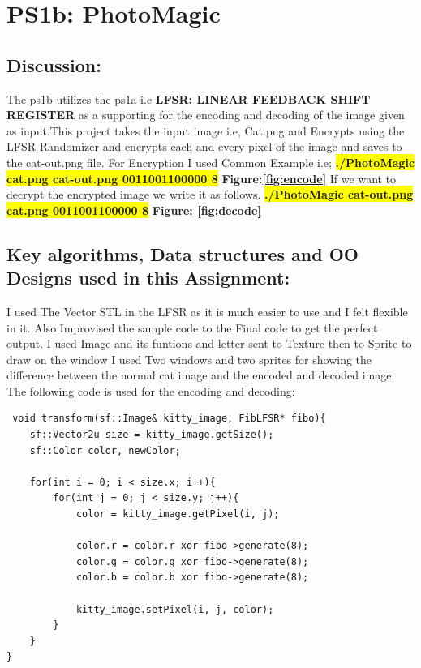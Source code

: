 \section{PS1b: PhotoMagic}\label{sec:ps1b}
\graphicspath{{ps1b}}
\subsection{Discussion:}\label{sec:ps1b:disc}
The ps1b utilizes the ps1a i.e \textbf{LFSR: LINEAR FEEDBACK SHIFT REGISTER} as a supporting for the encoding and decoding of the image given as input.This project takes the input image i.e, Cat.png and Encrypts using the LFSR Randomizer and encrypts each and every pixel
of the image and saves to the cat-out.png file.
   For Encryption I used Common Example i.e; \newline
    \colorbox{yellow}{\textbf{./PhotoMagic cat.png cat-out.png 0011001100000 8}} \newline
    \textbf{Figure:\ref{fig:encode}} \newline
If we want to decrypt the encrypted image we write it as follows. \newline
    \colorbox{yellow}{\textbf{./PhotoMagic cat-out.png cat.png 0011001100000 8}} \newline
     \textbf{Figure: \ref{fig:decode}}
    
\subsection{Key algorithms, Data structures and OO Designs used in this Assignment:}\label{sec:ps1b:kdo}

I used The Vector STL in the LFSR as it is much easier to use and I felt flexible in it. Also Improvised the sample code to the Final code to get the perfect output. I used Image and its funtions and letter sent to Texture then to Sprite to draw on the window I used Two windows and two sprites for showing the difference between the normal cat image and the encoded and decoded image. The following code is used for the encoding and decoding: \newline
 \begin{lstlisting}
 void transform(sf::Image& kitty_image, FibLFSR* fibo){
	sf::Vector2u size = kitty_image.getSize();
	sf::Color color, newColor;

	for(int i = 0; i < size.x; i++){
		for(int j = 0; j < size.y; j++){
			color = kitty_image.getPixel(i, j);

			color.r = color.r xor fibo->generate(8);
			color.g = color.g xor fibo->generate(8);
			color.b = color.b xor fibo->generate(8);

			kitty_image.setPixel(i, j, color);	
		}
	}
}
 \end{lstlisting}

